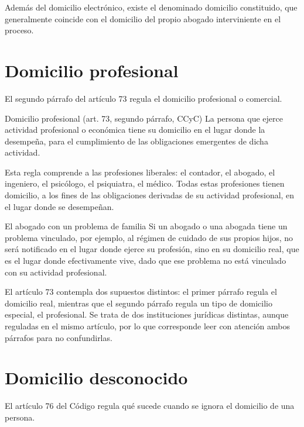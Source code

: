 \documentclass[12pt,oneside]{book}
\begin{document}
Además del domicilio electrónico, existe el denominado domicilio constituido, que generalmente coincide con el domicilio del propio abogado interviniente en el proceso.

\section{Domicilio profesional}

El segundo párrafo del artículo 73 regula el domicilio profesional o comercial.

\begin{definition}{Domicilio profesional (art. 73, segundo párrafo, CCyC)}
La persona que ejerce actividad profesional o económica tiene su domicilio en el lugar donde la desempeña, para el cumplimiento de las obligaciones emergentes de dicha actividad.
\end{definition}

Esta regla comprende a las profesiones liberales: el contador, el abogado, el ingeniero, el psicólogo, el psiquiatra, el médico. Todas estas profesiones tienen domicilio, a los fines de las obligaciones derivadas de su actividad profesional, en el lugar donde se desempeñan.

\begin{example}{El abogado con un problema de familia}
Si un abogado o una abogada tiene un problema vinculado, por ejemplo, al régimen de cuidado de sus propios hijos, no será notificado en el lugar donde ejerce su profesión, sino en su domicilio real, que es el lugar donde efectivamente vive, dado que ese problema no está vinculado con su actividad profesional.
\end{example}

\begin{important}
El artículo 73 contempla dos supuestos distintos: el primer párrafo regula el domicilio real, mientras que el segundo párrafo regula un tipo de domicilio especial, el profesional. Se trata de dos instituciones jurídicas distintas, aunque reguladas en el mismo artículo, por lo que corresponde leer con atención ambos párrafos para no confundirlas.
\end{important}

\section{Domicilio desconocido}

El artículo 76 del Código regula qué sucede cuando se ignora el domicilio de una persona.
\end{document}
